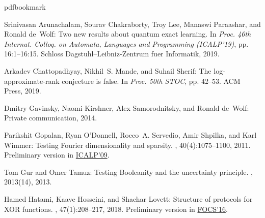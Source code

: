 \documentclass[11pt]{article}
\numberwithin{equation}{section}
\theoremstyle{definition}
\theoremstyle{plain}
\begin{document}
\providecommand{\bibhead}[1]{}
\expandafter\ifx\csname pdfbookmark\endcsname\relax%
  \providecommand{\tocrefpdfbookmark}{}
\else\providecommand{\tocrefpdfbookmark}{%
   \hypertarget{tocreferences}{}%
   \pdfbookmark[1]{References}{tocreferences}}%
\fi

\tocrefpdfbookmark
\begin{thebibliography}{10}

\bibhead{DBLP:journals/corr/abs-1810-00481}
{\sc Srinivasan Arunachalam, Sourav Chakraborty, Troy Lee, Manaswi Paraashar,
  and Ronald de~Wolf}: Two new results about quantum exact learning.
\newblock In {\em Proc. 46th Internat. Colloq. on Automata, Languages and
  Programming (ICALP'19)}, pp. 16:1--16:15. Schloss Dagstuhl--Leibniz-Zentrum
  fuer Informatik, 2019.

\bibhead{DBLP:journals/eccc/ChattopadhyayMS18}
{\sc Arkadev Chattopadhyay, Nikhil~S. Mande, and Suhail Sherif}: The
  log-approximate-rank conjecture is false.
\newblock In {\em Proc. 50th STOC}, pp. 42--53. ACM Press, 2019.
\newblock [\epfmtdoi{10.1145/3313276.3316353}]

\bibhead{alex}
{\sc Dmitry Gavinsky, Naomi Kirshner, Alex Samorodnitsky, and Ronald de~Wolf}:
  Private communication, 2014.

\bibhead{DBLP:journals/siamcomp/GopalanOSSW11}
{\sc Parikshit Gopalan, Ryan O'Donnell, Rocco~A. Servedio, Amir Shpilka, and
  Karl Wimmer}: Testing {F}ourier dimensionality and sparsity.
, 40(4):1075--1100, 2011.
\newblock Preliminary version in
  \href{https://link.springer.com/chapter/10.1007/978-3-642-02927-1_42}{ICALP'09}.
\newblock [\epfmtdoi{10.1137/100785429}]

\bibhead{DBLP:journals/cjtcs/GurT13}
{\sc Tom Gur and Omer Tamuz}: Testing {B}ooleanity and the uncertainty
  principle.
, 2013(14), 2013.

\bibhead{DBLP:conf/focs/HatamiHL16}
{\sc Hamed Hatami, Kaave Hosseini, and Shachar Lovett}: Structure of protocols
  for {XOR} functions.
, 47(1):208--217, 2018.
\newblock Preliminary version in
  \href{https://ieeexplore.ieee.org/document/7782941}{FOCS'16}.
\newblock [\epfmtdoi{10.1137/17M1136869}]


\end{thebibliography}
\end{document}
